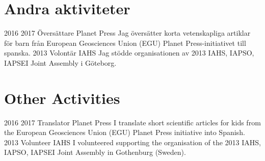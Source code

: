 \ifswedish
  \section{Andra aktiviteter}
      \position
          {2016 \textemdash{} 2017}
          {Översättare}
          {Planet Press}
          {Jag översätter korta vetenskapliga artiklar för barn från European Geosciences Union (EGU) Planet Press-initiativet till spanska.}
      \position
          {2013}
          {Volontär}
          {IAHS}
          {Jag stödde organisationen av 2013 IAHS, IAPSO, IAPSEI Joint Assembly i Göteborg.}
\else
  \section{Other Activities}
      \position
          {2016 \textemdash{} 2017}
          {Translator}
          {Planet Press}
          {I translate short scientific articles for kids from the European Geosciences Union (EGU) Planet Press initiative into Spanish.}
      \position
          {2013}
          {Volunteer}
          {IAHS}
          {I volunteered supporting the organisation of the 2013 IAHS, IAPSO, IAPSEI Joint Assembly in Gothenburg (Sweden).}
\fi
